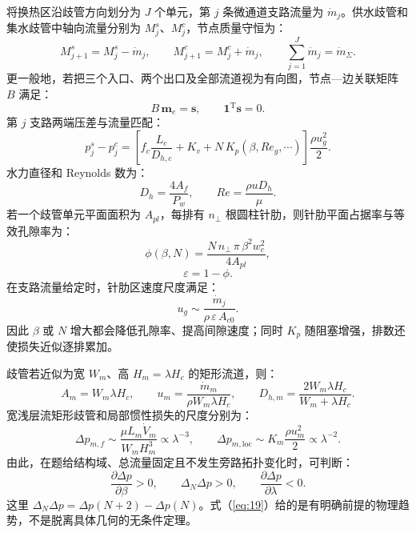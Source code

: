 \documentclass[12pt]{article}
\newcommand{\subsect}[1]{\par\vspace{6pt}\noindent{\fontsize{12pt}{17pt}\selectfont\hei #1}\par\vspace{2pt}}
\begin{document}
\subsect{5.1.3\quad 歧管—微通道水力网络}
将换热区沿歧管方向划分为 $J$ 个单元，第 $j$ 条微通道支路流量为 $\dot m_j$。供水歧管和集水歧管中轴向流量分别为 $M_j^s$、$M_j^c$，节点质量守恒为：
\begin{equation}
  M_{j+1}^{s} = M_j^{s} - \dot m_j, \qquad M_{j+1}^{c} = M_j^{c} + \dot m_j, \qquad \sum_{j=1}^{J}\dot m_j = \dot m_\Sigma.
  \label{eq:10}
\end{equation}
更一般地，若把三个入口、两个出口及全部流道视为有向图，节点—边关联矩阵 $B$ 满足：
\begin{equation}
  B\,\mathbf{m}_e = \mathbf{s}, \qquad \mathbf{1}^{\mathrm{T}}\mathbf{s} = 0.
  \label{eq:11}
\end{equation}
第 $j$ 支路两端压差与流量匹配：
\begin{equation}
  p_j^{s} - p_j^{c} = \left[f_c\frac{L_c}{D_{h,c}} + K_v + N\,K_p(\beta, Re_g, \cdots)\right]\frac{\rho u_g^{2}}{2}.
  \label{eq:12}
\end{equation}
水力直径和 Reynolds 数为：
\begin{equation}
  D_h = \frac{4A_f}{P_w}, \qquad Re = \frac{\rho u D_h}{\mu}.
  \label{eq:13}
\end{equation}
若一个歧管单元平面面积为 $A_{pl}$，每排有 $n_\perp$ 根圆柱针肋，则针肋平面占据率与等效孔隙率为：
\begin{equation}
  \phi(\beta, N) = \frac{N\, n_\perp\, \pi\, \beta^{2} w_c^{2}}{4 A_{pl}},
  \label{eq:14}
\end{equation}
\begin{equation}
  \varepsilon = 1 - \phi.
  \label{eq:15}
\end{equation}
在支路流量给定时，针肋区速度尺度满足：
\begin{equation}
  u_g \sim \frac{\dot m_j}{\rho\,\varepsilon\, A_{c0}}.
  \label{eq:16}
\end{equation}
因此 $\beta$ 或 $N$ 增大都会降低孔隙率、提高间隙速度；同时 $K_p$ 随阻塞增强，排数还使损失近似逐排累加。

歧管若近似为宽 $W_m$、高 $H_m = \lambda H_c$ 的矩形流道，则：
\begin{equation}
  A_m = W_m\lambda H_c, \qquad u_m = \frac{\dot m_m}{\rho W_m\lambda H_c}, \qquad D_{h,m} = \frac{2W_m\lambda H_c}{W_m + \lambda H_c}.
  \label{eq:17}
\end{equation}
宽浅层流矩形歧管和局部惯性损失的尺度分别为：
\begin{equation}
  \Delta p_{m,f} \sim \frac{\mu L_m \dot V_m}{W_m H_m^{3}} \propto \lambda^{-3}, \qquad
  \Delta p_{m,\mathrm{loc}} \sim K_m\frac{\rho u_m^{2}}{2} \propto \lambda^{-2}.
  \label{eq:18}
\end{equation}
由此，在题给结构域、总流量固定且不发生旁路拓扑变化时，可判断：
\begin{equation}
  \frac{\partial \Delta p}{\partial \beta} > 0, \qquad \Delta_N \Delta p > 0, \qquad
  \frac{\partial \Delta p}{\partial \lambda} < 0.
  \label{eq:19}
\end{equation}
这里 $\Delta_N \Delta p = \Delta p(N + 2) - \Delta p(N)$。式（\ref{eq:19}）给的是有明确前提的物理趋势，不是脱离具体几何的无条件定理。
\end{document}
